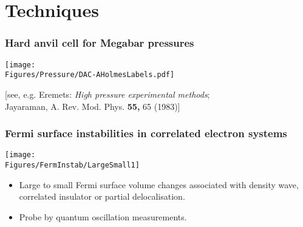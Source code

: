 \section{Techniques}

\begin{frame}[label=Diamond anvil]
\frametitle{Hard anvil cell for Megabar pressures}

\texttt{[image: \\Figures/Pressure/DAC-AHolmesLabels.pdf]}


\begin{center} 
{\small [see, e.g. Eremets: {\em High pressure
    experimental methods}; \\ Jayaraman, A. Rev. Mod. Phys. {\bf
    55,} 65 (1983)] }
\end{center}
\end{frame}





\begin{frame}[label=FSInstabilities]
\frametitle{Fermi surface instabilities in correlated electron
  systems}
\centerline{\texttt{[image: \\Figures/FermInstab/LargeSmall1]}}
\begin{itemize}
\item
Large to small Fermi surface volume changes associated with density
wave, correlated insulator or partial delocalisation.

\item%
Probe by quantum oscillation measurements.

\end{itemize}
\end{frame}






